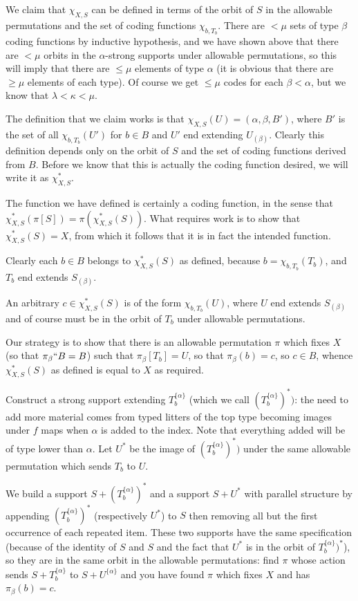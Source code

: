 \documentclass[112pt]{article}
\begin{document}
\begin{description}
We claim that $\chi_{X,S}$ can be defined in terms of the orbit of $S$ in the allowable permutations and the set of coding functions $\chi_{b,T_b}$.  There are $<\mu$ sets of type $\beta$ coding functions by inductive hypothesis, and we have shown above that there are $<\mu$ orbits in the $\alpha$-strong supports under allowable permutations, so this will imply that there are $\leq \mu$ elements of type $\alpha$ (it is obvious that there are $\geq \mu$ elements of each type).
Of course we get $\leq \mu$ codes for each $\beta<\alpha$, but we know that $\lambda<\kappa<\mu$.

The definition that we claim works is that $\chi_{X,S}(U) = (\alpha,\beta,B')$, where $B'$ is the set of all $\chi_{b,T_b}(U')$ for $b \in B$ and $U'$ end extending $U_{(\beta)}$.  Clearly this definition depends only on the orbit of $S$ and the set of coding functions derived from $B$.  Before we know that this is actually the coding function desired, we will write it as $\chi_{X,S}^*$.

The function we have defined is certainly a coding function, in the sense that $\chi_{X,S}^*(\pi[S]) = \pi(\chi_{X,S}^*(S))$.  What requires work is to show that
$\chi_{X,S}^*(S)=X$, from which it follows that it is in fact the intended function.

Clearly each $b \in B$ belongs to $\chi^*_{X,S}(S)$ as defined, because $b = \chi_{b,T_b}(T_b)$, and $T_b$ end extends $S_{(\beta)}$.

An arbitrary $c \in \chi_{X,S}^*(S)$ is of the form $\chi_{b,T_b}(U)$, where $U$ end extends $S_{(\beta)}$ and of course must be in the orbit of $T_b$ under allowable permutations.

Our strategy is to show that there is an allowable permutation $\pi$ which fixes $X$ (so that $\pi_\beta``B = B$) such that $\pi_\beta[T_b]=U$, so that
$\pi_\beta(b) = c$, so $c \in B$, whence $\chi^*_{X,S}(S)$ as defined is equal to $X$ as required.

Construct a strong support extending $T_b^{\{\alpha\}}$ (which we call $(T_b^{\{\alpha\}})^*)$:  the need to add more material comes
from typed litters of the top type becoming images under $f$ maps when $\alpha$ is added to the index.  Note that everything added will be of type lower than $\alpha$.  Let $U^*$ be the image of $(T_b^{\{\alpha\}})^*)$ under the same allowable permutation which sends $T_b$ to $U$.

We build a support $S+(T_b^{\{\alpha\}})^*$ and a support $S+U^*$ with parallel structure by appending $(T_b^{\{\alpha\}})^*$ (respectively $U^*$) to $S$ then removing all but the first occurrence of each repeated item.   These two supports have the same specification (because of the identity of $S$ and $S$
and the fact that $U^*$ is in the orbit of $T_b^{\{\alpha\}})^*$), so they are in the same orbit in the allowable permutations:  find $\pi$ whose action sends $S+T_b^{\{\alpha\}}$ to $S+U^{\{\alpha\}}$ and you have found $\pi$ which fixes $X$ and has $\pi_\beta(b)=c$.

\end{description}
\end{document}
